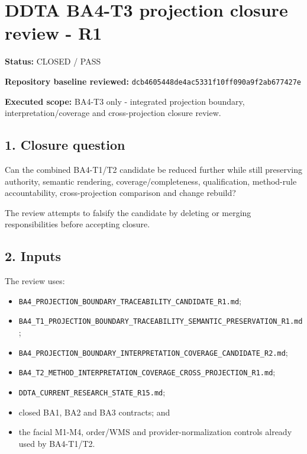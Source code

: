 \documentclass[
  11pt,
  a4paper,
]{article}
\author{}
\date{}
\providecommand{\tightlist}{%
  \setlength{\itemsep}{0pt}\setlength{\parskip}{0pt}}
\begin{document}
\section{DDTA BA4-T3 projection closure review -
R1}\label{ddta-ba4-t3-projection-closure-review---r1}

\textbf{Status:} CLOSED / PASS

\textbf{Repository baseline reviewed:}
\texttt{dcb4605448de4ac5331f10ff090a9f2ab677427e}

\textbf{Executed scope:} BA4-T3 only - integrated projection boundary,
interpretation/coverage and cross-projection closure review.

\subsection{1. Closure question}\label{closure-question}

Can the combined BA4-T1/T2 candidate be reduced further while still
preserving authority, semantic rendering, coverage/completeness,
qualification, method-rule accountability, cross-projection comparison
and change rebuild?

The review attempts to falsify the candidate by deleting or merging
responsibilities before accepting closure.

\subsection{2. Inputs}\label{inputs}

The review uses:

\begin{itemize}
\tightlist
\item
  \texttt{BA4\_PROJECTION\_BOUNDARY\_TRACEABILITY\_CANDIDATE\_R1.md};
\item
  \texttt{BA4\_T1\_PROJECTION\_BOUNDARY\_TRACEABILITY\_SEMANTIC\_PRESERVATION\_R1.md};
\item
  \texttt{BA4\_PROJECTION\_BOUNDARY\_INTERPRETATION\_COVERAGE\_CANDIDATE\_R2.md};
\item
  \texttt{BA4\_T2\_METHOD\_INTERPRETATION\_COVERAGE\_CROSS\_PROJECTION\_R1.md};
\item
  \texttt{DDTA\_CURRENT\_RESEARCH\_STATE\_R15.md};
\item
  closed BA1, BA2 and BA3 contracts; and
\item
  the facial M1-M4, order/WMS and provider-normalization controls
  already used by BA4-T1/T2.
\end{itemize}
\end{document}
